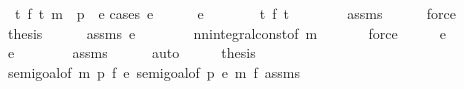 \begin{isabellebody}
\ {\isachardoublequoteopen}{\isasymintegral}\isactrlsup {\isacharplus}{\kern0pt}\ t{\isachardot}{\kern0pt}\ {\isacharparenleft}{\kern0pt}f\ t{\isacharparenright}{\kern0pt}\ {\isasympartial}m\ {\isacharequal}{\kern0pt}\ p{}\ {\isacharasterisk}{\kern0pt}\ e{\isachardoublequoteclose}\isanewline
%
\isadelimproof
%
\endisadelimproof
%
\isatagproof
{}\isamarkupfalse%
{\isacharparenleft}{\kern0pt}cases\ {\isachardoublequoteopen}e\ {\isacharequal}{\kern0pt}\ {}{\isachardoublequoteclose}{\isacharparenright}{\kern0pt}\isanewline
\ \ \isamarkupfalse%
\ {\isachardoublequoteopen}e\ {\isacharequal}{\kern0pt}\ {}{\isachardoublequoteclose}\isanewline
\ \ \isamarkupfalse%
\ \isamarkupfalse%
\ {\isachardoublequoteopen}{\isasymAnd}t{\isachardot}{\kern0pt}\ f\ t\ {\isacharequal}{\kern0pt}\ {}{\isachardoublequoteclose}\isanewline
\ \ \ \ \isamarkupfalse%
\ assms\isanewline
\ \ \ \ \isamarkupfalse%
\ force\isanewline
\ \ \isamarkupfalse%
\ \isamarkupfalse%
\ {\isacharquery}{\kern0pt}thesis\isanewline
\ \ \ \ \isamarkupfalse%
\ assms{\isacharparenleft}{\kern0pt}{}{\isacharparenright}{\kern0pt}\ {\isacartoucheopen}e\ {\isacharequal}{\kern0pt}\ {}{\isacartoucheclose}\isanewline
\ \ \ \ \isamarkupfalse%
\ nn{\isacharunderscore}{\kern0pt}integral{\isacharunderscore}{\kern0pt}const{\isacharbrackleft}{\kern0pt}of\ m\ {}{\isacharbrackright}{\kern0pt}\isanewline
\ \ \ \ \isamarkupfalse%
\ force\isanewline
{}\isamarkupfalse%
\ \isanewline
\ \ \isamarkupfalse%
\ {\isachardoublequoteopen}e\ {\isasymnoteq}\ {}{\isachardoublequoteclose}\isanewline
\ \ \isamarkupfalse%
\ \isamarkupfalse%
\ {\isachardoublequoteopen}e\ {\isachargreater}{\kern0pt}\ {}{\isachardoublequoteclose}\isanewline
\ \ \ \ \isamarkupfalse%
\ assms\isanewline
\ \ \ \ \isamarkupfalse%
\ auto\isanewline
\ \ \isamarkupfalse%
\ \isamarkupfalse%
\ {\isacharquery}{\kern0pt}thesis\isanewline
\ \ \isamarkupfalse%
\ semi{\isacharunderscore}{\kern0pt}goal{}{}{\isacharbrackleft}{\kern0pt}of\ m\ p{}\ f\ e{\isacharbrackright}{\kern0pt}\ semi{\isacharunderscore}{\kern0pt}goal{}{}{\isacharbrackleft}{\kern0pt}of\ p{}\ e\ m\ f{\isacharbrackright}{\kern0pt}\ assms\isanewline

\end{isabellebody}
